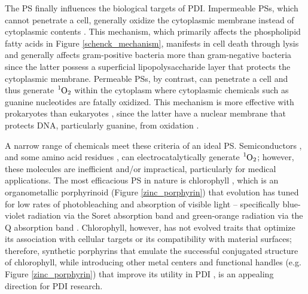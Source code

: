 The PS finally influences the biological targets of PDI. Impermeable PSs, which cannot penetrate a cell, generally oxidize the cytoplasmic membrane \cite{Specht1990DepolarizationAction,Ehrenberg1993ElectricAlterations} instead of cytoplasmic contents \cite{Maisch2004AntibacterialDermatology}. This mechanism, which primarily affects the phospholipid fatty acids in Figure \ref{schenck_mechanism}, manifests in cell death through lysis \cite{Sahu2009AtomicColi,Bertoloni1987RoleCells} and generally affects gram-positive bacteria more than gram-negative bacteria \cite{Lauro2002PhotoinactivationConjugates,Merchat1996Meso-substitutedBacteria} since the latter possess a superficial lipopolysaccharide layer that protects the cytoplasmic membrane. Permeable PSs, by contrast, can penetrate a cell and thus generate $\ce{^1O2}$ within the cytoplasm where cytoplasmic chemicals \cite{Bagchi1979RoleAcriflavine} such as guanine nucleotides \cite{Prat1997Determination9,Devasagayam1991FormationOxygen} are fatally oxidized. This mechanism is more effective with prokaryotes than eukaryotes \cite{Quishida2016PhotodynamicLight}, since the latter have a nuclear membrane that protects DNA, particularly guanine, from oxidation \cite{Pereira2013PhotodynamicVitro}.

A narrow range of chemicals meet these criteria of an ideal PS. Semiconductors \cite{Nelson2002PhotoconductivityDioxide,Peiro2006PhotochemicalPreparations,Linsebigler1995PhotocatalysisResults}, and some amino acid residues \cite{Lippincott-schwartz2003PhotobleachingTechniques,Jin1995PhotolysisSolution}, can electrocatalytically generate $\ce{^1O2}$; however, these molecules are inefficient and/or impractical, particularly for medical applications. The most efficacious PS in nature is chlorophyll \cite{Ramel2012ChemicalPlants}, which is an organometallic porphyrinoid (Figure \ref{zinc_porphyrin}) that evolution has tuned for low rates of photobleaching and absorption of visible light -- specifically blue-violet radiation \cite{Mtangi2017ControlSplitting} via the Soret absorption band \cite{Carre1999FungicidalCerevisiae,Pereira2014InfluencePorphyrin,Ashkenazi2003PhotodynamicBacteria,Moan1986PorphyrinShGroups,Nitzan1992InactivationPorphyrins,Durantini2006PhotodynamicBacteria,Salmon-Divon2004MechanisticTetra-mesoN-methylpyridylporphine} and green-orange radiation \cite{Bertoloni2000PhotosensitizingCells} via the Q absorption band \cite{Bonnett1999PhotobleachingStudy,Jori2006PhotodynamicApplications,Gad2004TargetedMice,Zhao2019Porphyrin-basedAbsorption}. Chlorophyll, however, has not evolved traits that optimize its association with cellular targets or its compatibility with material surfaces; therefore, synthetic porphyrins \cite{Orenstein1997TheInfections,Beirao2014PhotodynamicPorphyrin,Merchat1996StudiesPorphyrins} that emulate the successful conjugated structure \cite{Huang2008Porphyrin-dithienothiopheneCells} of chlorophyll, while introducing other metal centers \cite{Mosinger1997QuantumPorphine} and functional handles  \cite{Hirao1999TheoreticalDerivatives,Wu2014BODIPY-basedSolution,Chacon1988SingletArachidonic} (e.g. Figure \ref{zinc_porphyrin}) that improve its utility in PDI \cite{Jager2016QScales,Karolczak2004PhotophysicalTetraphenylporphyrin,Mathai2007SingletTherapy}, is an appealing direction for PDI research. 

